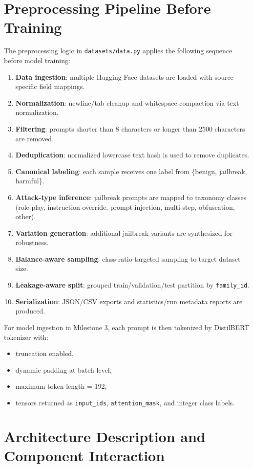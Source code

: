 \documentclass[11pt]{article}
\begin{document}
\section{Preprocessing Pipeline Before Training}
The preprocessing logic in \texttt{datasets/data.py} applies the following sequence before model training:
\begin{enumerate}[leftmargin=*]
\item \textbf{Data ingestion}: multiple Hugging Face datasets are loaded with source-specific field mappings.
\item \textbf{Normalization}: newline/tab cleanup and whitespace compaction via text normalization.
\item \textbf{Filtering}: prompts shorter than 8 characters or longer than 2500 characters are removed.
\item \textbf{Deduplication}: normalized lowercase text hash is used to remove duplicates.
\item \textbf{Canonical labeling}: each sample receives one label from \{benign, jailbreak, harmful\}.
\item \textbf{Attack-type inference}: jailbreak prompts are mapped to taxonomy classes (role-play, instruction override, prompt injection, multi-step, obfuscation, other).
\item \textbf{Variation generation}: additional jailbreak variants are synthesized for robustness.
\item \textbf{Balance-aware sampling}: class-ratio-targeted sampling to target dataset size.
\item \textbf{Leakage-aware split}: grouped train/validation/test partition by \texttt{family\_id}.
\item \textbf{Serialization}: JSON/CSV exports and statistics/run metadata reports are produced.
\end{enumerate}

For model ingestion in Milestone 3, each prompt is then tokenized by DistilBERT tokenizer with:
\begin{itemize}[leftmargin=*]
\item truncation enabled,
\item dynamic padding at batch level,
\item maximum token length = 192,
\item tensors returned as \texttt{input\_ids}, \texttt{attention\_mask}, and integer class labels.
\end{itemize}

\section{Architecture Description and Component Interaction}
\end{document}
